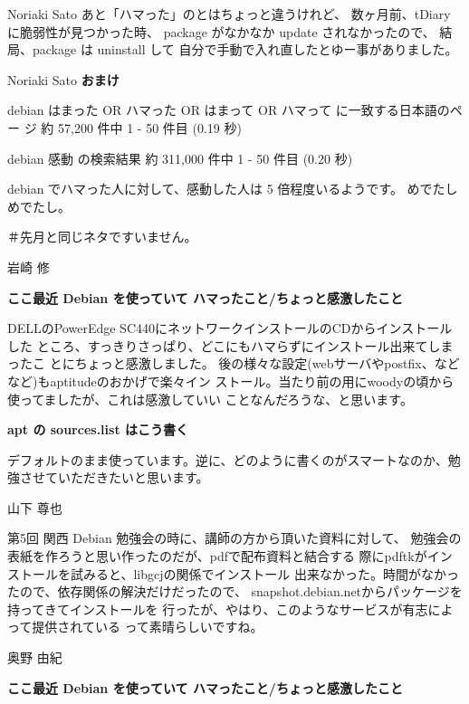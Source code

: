\documentclass[cjk,dvipdfmx,12pt]{beamer}
\begin{document}
\begin{frame}{Noriaki Sato}
あと「ハマった」のとはちょっと違うけれど、
数ヶ月前、tDiary に脆弱性が見つかった時、
package がなかなか update されなかったので、
結局、package は uninstall して
自分で手動で入れ直したとゆー事がありました。

\end{frame}\begin{frame}{Noriaki Sato}
\textbf{おまけ}

debian はまった OR ハマった OR はまって OR ハマって に一致する日本語のペー
ジ 約 57,200 件中 1 - 50 件目 (0.19 秒) 

debian 感動 の検索結果 約 311,000 件中 1 - 50 件目 (0.20 秒) 

debian でハマった人に対して、感動した人は 5 倍程度いるようです。
めでたしめでたし。

＃先月と同じネタですいません。

\end{frame}\begin{frame}{岩崎 修}

\textbf{ここ最近 Debian を使っていて ハマったこと/ちょっと感激したこと}

DELLのPowerEdge SC440にネットワークインストールのCDからインストールした
ところ、すっきりさっぱり、どこにもハマらずにインストール出来てしまったこ
とにちょっと感激しました。
後の様々な設定(webサーバやpostfix、などなど)もaptitudeのおかげで楽々イン
ストール。当たり前の用にwoodyの頃から使ってましたが、これは感激していい
ことなんだろうな、と思います。

\textbf{apt の sources.list はこう書く}

デフォルトのまま使っています。逆に、どのように書くのがスマートなのか、勉
強させていただきたいと思います。

\end{frame}\begin{frame}{山下 尊也}

第5回 関西 Debian 勉強会の時に、講師の方から頂いた資料に対して、
勉強会の表紙を作ろうと思い作ったのだが、pdfで配布資料と結合する
際にpdftkがインストールを試みると、libgcjの関係でインストール
出来なかった。時間がなかったので、依存関係の解決だけだったので、
snapshot.debian.netからパッケージを持ってきてインストールを
行ったが、やはり、このようなサービスが有志によって提供されている
って素晴らしいですね。

\end{frame}\begin{frame}{奥野 由紀}

\textbf{ここ最近 Debian を使っていて ハマったこと/ちょっと感激したこと}


\end{frame}
\end{document}
